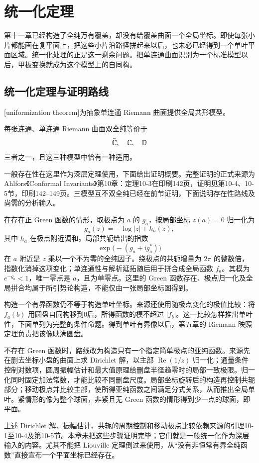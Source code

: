 \section{统一化定理}
\label{b3:sec:1202}

第十一章已经构造了全纯万有覆盖，却没有给覆盖曲面一个全局坐标。即使每张小片都能画在复平面上，把这些小片沿路径拼起来以后，也未必已经得到一个单叶平面区域。统一化处理的正是这一剩余问题。把单连通曲面识别为一个标准模型以后，甲板变换就成为这个模型上的自同构。

\subsection{统一化定理与证明路线}
\label{b3:subsec:120201}

[uniformization theorem]为抽象单连通 Riemann 曲面提供全局共形模型。

\begin{theorem}[深层统一化定理]\label{b3:thm:12-uniformization}
每张连通、单连通 Riemann 曲面双全纯等价于
\[
 \widehat{\mathbb C\kern0pt},\quad \mathbb C,\quad \mathbb D
\]
三者之一，且这三种模型中恰有一种适用。
\end{theorem}
\begin{proofsketch}
一般存在性在这里作为深层定理使用，下面给出证明概要。完整证明的正式来源为 Ahlfors《Conformal Invariants》\cite{Ahlfors2010Conformal}第10章：定理10-3在印刷142页，证明见第10-4、10-5节，印刷142--149页。三模型互不双全纯已经在前节证明，下面说明存在性路线及尚需的分析输入。

在存在正 Green 函数的情形，取极点为 \(a\) 的 \(g_a\)，按局部坐标 \(z(a)=0\) 归一化为
\[
 g_a(z)=-\log|z|+h_a(z),
\]
其中 \(h_a\) 在极点附近调和。局部共轭给出的指数
\[
 \exp\bigl(-(g_a+\mathrm i g_a^*)\bigr)
\]
在 \(a\) 附近是 \(z\) 乘以一个不为零的全纯因子。绕极点的共轭增量为 \(2\pi\) 的整数倍，指数化消掉这项变化；单连通性与解析延拓随后用于拼合成全局函数 \(f_a\)。其模为 \(e^{-g_a}<1\)，唯一零点是 \(a\)，且为单零点。这里的 Green 函数存在、极点归一化及全局拼合均属于所引势论构造，不能仅由一张局部坐标图得到。

构造一个有界函数仍不等于构造单叶坐标。来源还使用随极点变化的极值比较：将 \(f_a(b)\) 用圆盘自同构移到0后，所得函数的模不超过 \(|f_b|\)。这一比较怎样推出单叶性，下面单列为完整的条件命题。得到单叶有界像以后，第五章的 Riemann 映照定理负责把该像映满圆盘。

不存在 Green 函数时，路线改为构造只有一个指定简单极点的亚纯函数。来源先在删去坐标小盘的曲面上求 Dirichlet 解，以主部 \(\operatorname{Re}(1/z)\) 归一化；通量条件控制对数项，圆周振幅估计和最大值原理给删盘半径趋零时的局部一致极限。归一化同时固定加法常数，才能比较不同删盘尺度。局部坐标旋转后的构造再控制共轭部分；移动极点并比较主部，使所得亚纯函数之间满足分式关系，从而推出全局单叶。紧情形的像为整个球面，非紧且无 Green 函数的情形得到少一点的球面，即平面。

上述 Dirichlet 解、振幅估计、共轭的周期控制和移动极点比较依赖来源的引理10-1至10-4及第10-5节。本章未把这些步骤证明完毕；它们就是一般统一化作为深层输入的内容。尤其不能把 Liouville 定理倒过来使用，从“没有非恒常有界全纯函数”直接宣布一个平面坐标已经存在。
\end{proofsketch}

